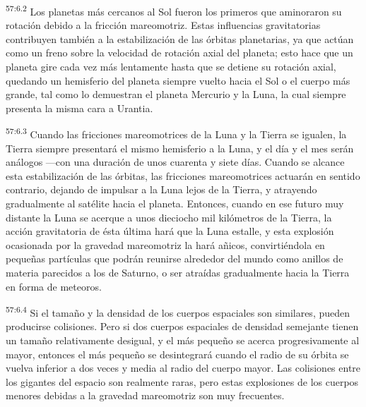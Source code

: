 \par
\textsuperscript{57:6.2} Los planetas más cercanos al Sol fueron los primeros que aminoraron su rotación debido a la fricción mareomotriz. Estas influencias gravitatorias contribuyen también a la estabilización de las órbitas planetarias, ya que actúan como un freno sobre la velocidad de rotación axial del planeta; esto hace que un planeta gire cada vez más lentamente hasta que se detiene su rotación axial, quedando un hemisferio del planeta siempre vuelto hacia el Sol o el cuerpo más grande, tal como lo demuestran el planeta Mercurio y la Luna, la cual siempre presenta la misma cara a Urantia.

\par
\textsuperscript{57:6.3} Cuando las fricciones mareomotrices de la Luna y la Tierra se igualen, la Tierra siempre presentará el mismo hemisferio a la Luna, y el día y el mes serán análogos ---con una duración de unos cuarenta y siete días. Cuando se alcance esta estabilización de las órbitas, las fricciones mareomotrices actuarán en sentido contrario, dejando de impulsar a la Luna lejos de la Tierra, y atrayendo gradualmente al satélite hacia el planeta. Entonces, cuando en ese futuro muy distante la Luna se acerque a unos dieciocho mil kilómetros de la Tierra, la acción gravitatoria de ésta última hará que la Luna estalle, y esta explosión ocasionada por la gravedad mareomotriz la hará añicos, convirtiéndola en pequeñas partículas que podrán reunirse alrededor del mundo como anillos de materia parecidos a los de Saturno, o ser atraídas gradualmente hacia la Tierra en forma de meteoros.

\par
\textsuperscript{57:6.4} Si el tamaño y la densidad de los cuerpos espaciales son similares, pueden producirse colisiones. Pero si dos cuerpos espaciales de densidad semejante tienen un tamaño relativamente desigual, y el más pequeño se acerca progresivamente al mayor, entonces el más pequeño se desintegrará cuando el radio de su órbita se vuelva inferior a dos veces y media al radio del cuerpo mayor. Las colisiones entre los gigantes del espacio son realmente raras, pero estas explosiones de los cuerpos menores debidas a la gravedad mareomotriz son muy frecuentes.

